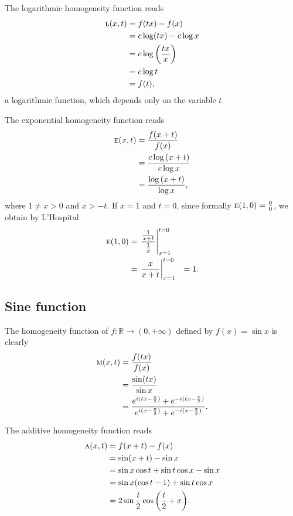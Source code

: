 \documentclass{amsart}
\makeatletter
\theoremstyle{plain}
\numberwithin{equation}{section}
\def\pi{\Greekmath 0119 }%
\def\FindBoldGroup{%
   {\setbox0=\hbox{$\mathbf{x\global\edef\theboldgroup{\the\mathgroup}}$}}%
}
\def\Greekmath#1#2#3#4{%
    \if@compatibility
        \ifnum\mathgroup=\symbold
           \mathchoice{\mbox{\boldmath$\displaystyle\mathchar"#1#2#3#4$}}%
                      {\mbox{\boldmath$\textstyle\mathchar"#1#2#3#4$}}%
                      {\mbox{\boldmath$\scriptstyle\mathchar"#1#2#3#4$}}%
                      {\mbox{\boldmath$\scriptscriptstyle\mathchar"#1#2#3#4$}}%
        \else
           \mathchar"#1#2#3#4%
        \fi 
    \else 
        \FindBoldGroup
        \ifnum\mathgroup=\theboldgroup %
           \mathchoice{\mbox{\boldmath$\displaystyle\mathchar"#1#2#3#4$}}%
                      {\mbox{\boldmath$\textstyle\mathchar"#1#2#3#4$}}%
                      {\mbox{\boldmath$\scriptstyle\mathchar"#1#2#3#4$}}%
                      {\mbox{\boldmath$\scriptscriptstyle\mathchar"#1#2#3#4$}}%
        \else
           \mathchar"#1#2#3#4%
        \fi     	    
	  \fi}
\newcommand{\eh}{\textsc{e}}
\newcommand{\R}{{\mathbb{R}}}
\makeatother
\begin{document}
The logarithmic homogeneity function reads
\begin{align*}
\textsc{l}(x,t)&=f(tx)-f(x)\\
&={c \log(tx)}-{c\log{x}}\\
&=c \log{\left(\frac{tx}{x}\right)}\\
&=c \log{t}\\
&= f(t),
\end{align*}
a logarithmic function, which depends only on the variable $t$. 

The exponential homogeneity function reads
\begin{align*}
\eh(x,t)&=\frac{f(x+t)}{f(x)}\\
&=\frac{c\log{(x+t)}}{c\log{x}}\\
&=\frac{\log{(x+t)}}{\log{x}},
\end{align*}
where $1 \neq x > 0$ and $x>-t$.
If $x=1$ and $t=0$, since formally $\eh(1,0)=\frac{0}{0}$,
we obtain by L'Hospital 
\begin{align*}
\eh(1,0)&=\left. \frac{\frac{1}{{x+t}}}{\frac{1}{{x}}}  \right|_{x=1}^{t=0}
\\
&= \left. \frac{x}{x+t}  \right|_{x=1}^{t=0}
&=1.
\end{align*}




\subsection{Sine function}
The homogeneity function of $f:\R \to (0, +\infty)$ defined by $f(x)=\sin{x}$
is clearly
\begin{align*}
\textsc{m}(x,t)&=\frac{f(tx)}{f(x)}\\
&=\frac{\sin(tx)}{\sin{x}}\\
&= 
\frac{e^{i(tx -\frac{\pi}{2})} + e^{-i(tx -\frac{\pi}{2})}}{e^{i(x -\frac{\pi}{2})}
+ e^{-i(x -\frac{\pi}{2})}}.
\end{align*}

The additive homogeneity function reads
\begin{align*}
\textsc{a}(x,t)&=f(x+t)-f(x)\\
&={\sin(x+t)}-{\sin{x}}\\
&=\sin{x} \cos{t}+\sin{t}\cos{x}-\sin{x}\\
&= \sin{x} (\cos{t}-1)+ \sin{t} \cos{x} \\
&= 2 \sin{\frac{t}{2}} \cos{\left(\frac{t}{2}+x\right)}.
\end{align*}
\end{document}
